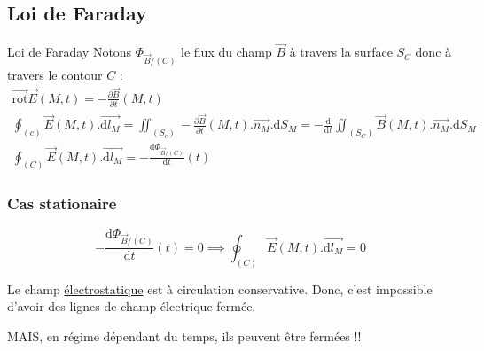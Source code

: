 
\subsection{Loi de Faraday} %
\label{sub:Loi de Faraday}


\begin{Theorem}{Loi de Faraday}{}
  Notons $\Phi _{\overrightarrow{B}/(C)}$ le flux du champ $\overrightarrow{B}$ à travers la surface $S_C$ donc à travers le contour $C$ : 
\begin{gather}
  \overrightarrow{\mathrm{rot}} \overrightarrow{E} (M,t) = - \frac{\partial \overrightarrow{B}}{\partial t} (M,t) \\ 
  \oint _{{(c)}} \overrightarrow{E} (M,t) . \overrightarrow{\mathrm{d}l_M} = \iint _{(S_c)} - \frac{\partial  \overrightarrow{B}}{\partial t} (M,t) . \overrightarrow{n_M}. \mathrm{d}S_M = - \frac{\mathrm{d}}{\mathrm{d}t}  \iint _{(S_C)} \overrightarrow{B}(M,t) . \overrightarrow{n_M}. \mathrm{d} S_M \\ 
  \boxed{\oint _{(C)} \overrightarrow{E}(M,t). \overrightarrow{\mathrm{d}l_M} = - \frac{\mathrm{d} \Phi _{\overrightarrow{B}/(C)}}{\mathrm{d}t} (t)}
\end{gather}
\end{Theorem}

\subsubsection{Cas stationaire} %
\label{sec:Cas stationaire}
\begin{equation}
  - \frac{\mathrm{d} \Phi _{\overrightarrow{B}/(C)}}{\mathrm{d}t} (t) = 0 \implies \oint _{(C)}  \overrightarrow{E}(M,t). \overrightarrow{\mathrm{d} l_M} = 0
\end{equation}

Le champ \underline{électrostatique} est à circulation conservative. Donc, c'est impossible d'avoir des lignes de champ électrique fermée. 

MAIS, en régime dépendant du temps, ils peuvent être fermées !!

